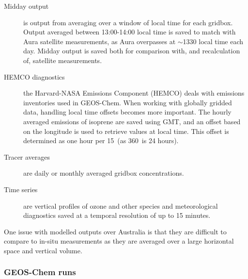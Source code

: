       
      \begin{description}
        \item[Midday output]%
        is output from averaging over a window of local time for each gridbox. 
        Output averaged between 13:00-14:00 local time is saved to match with Aura satellite measurements, as Aura overpasses at $\sim$1330 local time each day.
        Midday output is saved both for comparison with, and recalculation of, satellite measurements.
        \item[HEMCO diagnostics]%
        the Harvard-NASA Emissions Component (HEMCO) deals with emissions inventories used in GEOS-Chem.
        When working with globally gridded data, handling local time offsets becomes more important.
        The hourly averaged emissions of isoprene are saved using GMT, and an offset based on the longitude is used to retrieve values at local time.
        This offset is determined as one hour per 15\degr ~(as 360\degr ~is 24 hours).
        \item[Tracer averages]%
        are daily or monthly averaged gridbox concentrations. 
        \item[Time series]%
        are vertical profiles of ozone and other species and meteorological diagnostics saved at a temporal resolution of up to 15 minutes.
      \end{description}
      
      One issue with modelled outputs over Australia is that they are difficult to compare to in-situ measurements as they are averaged over a large horizontal space and vertical volume.
      
    \subsubsection{GEOS-Chem runs}
      \label{Model:GC:simulations:runs}
      
